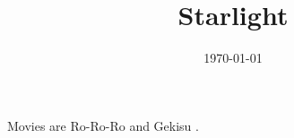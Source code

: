 \documentclass[
 reprint,
 aps,
 prl,
 superscriptaddress,
 amsmath,
 amssymb,
 floatfix
]{revtex4-2}
\begin{document}
\title{Starlight}
\date{\today}

\maketitle
\onecolumngrid



Movies are Ro-Ro-Ro and Gekisu \cite{Furukawa_RRR_2020,Aijo_gekisu_2021}.
\end{document}
